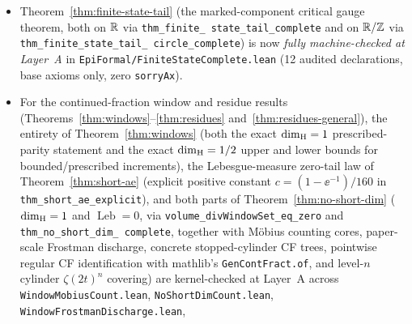\begin{itemize}[leftmargin=1.5em]
$h_k$ (\texttt{critGauge}), $g_2$ (\texttt{binaryGauge}), and $g_\beta$
(\texttt{interpGauge}), discharges all external continuity hypotheses for
Theorem~\ref{thm:gauge} and Remark~\ref{rem:gauge-scale}, constructively proves
open-interval and open-arc $\mathcal H^{h_k}$-infinitude
(Corollary~\ref{cor:exact-gauge}(i) on $\R$ and \texttt{UnitAddCircle}), and
verifies the binary Cantor-tree positivity, $\mathcal H^{g_2}$-infinitude on
every nonempty open subset of $\R/\Z$, $\sigma$-finiteness,
$\mathcal H^{h_k}$-nullity, and $g_\beta$ threshold dichotomy for
$E_{\mathrm{lim}}(k/4)$ in Theorem~\ref{thm:trichotomy}(ii), while
\texttt{TrichotomyAndPolyExtension.lean} proves the signed-limit coset collapse
$E_{\mathrm{lim}}^\pm(k/4)=x_k^\pm+L$ in Theorem~\ref{thm:trichotomy}(iii).
\item Theorem~\ref{thm:finite-state-tail} (the marked-component critical gauge
theorem, both on $\R$ via \texttt{thm\_\allowbreak finite\_\allowbreak
state\_\allowbreak tail\_\allowbreak complete} and on $\R/\Z$ via
\texttt{thm\_\allowbreak finite\_\allowbreak state\_\allowbreak tail\_\allowbreak
circle\_\allowbreak complete}) is now \emph{fully machine-checked at Layer~A}
in \texttt{EpiFormal/\allowbreak Finite\allowbreak State\allowbreak Complete.lean}
(12 audited declarations, base axioms only, zero \texttt{sorryAx}).
\item For the continued-fraction window and residue results
(Theorems~\ref{thm:windows}--\ref{thm:residues} and~\ref{thm:residues-general}),
the entirety of Theorem~\ref{thm:windows} (both the exact $\dim_{\mathrm{H}}=1$
prescribed-parity statement and the exact $\dim_{\mathrm{H}}=1/2$ upper and lower bounds
for bounded/prescribed increments), the Lebesgue-measure zero-tail law of
Theorem~\ref{thm:short-ae} (explicit positive constant $c = (1-\ee^{-1})/160$ in
\texttt{thm\_\allowbreak short\_\allowbreak ae\_\allowbreak explicit}), and
both parts of Theorem~\ref{thm:no-short-dim} ($\dim_{\mathrm{H}}=1$ and
$\operatorname{Leb}=0$, via
\texttt{volume\_\allowbreak divWindowSet\_\allowbreak eq\_\allowbreak zero}
and \texttt{thm\_\allowbreak no\_\allowbreak short\_\allowbreak dim\_\allowbreak
complete}, together with M\"obius counting cores, paper-scale Frostman
discharge, concrete stopped-cylinder CF trees, pointwise regular CF
identification with mathlib's \texttt{GenContFract.of}, and level-$n$ cylinder
$\zeta(2t)^n$ covering) are kernel-checked at Layer~A across
\texttt{Window\allowbreak Mobius\allowbreak Count.lean},
\texttt{No\allowbreak Short\allowbreak Dim\allowbreak Count.lean},
\texttt{Window\allowbreak Frostman\allowbreak Discharge.lean},

\end{itemize}
